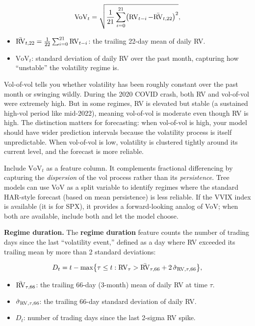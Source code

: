 \begin{equation}\label{eq:vol-of-vol}
\text{VoV}_t = \sqrt{\frac{1}{21}\sum_{i=0}^{21} \bigl(\operatorname{RV}_{t-i} - \bar{\operatorname{RV}}_{t,22}\bigr)^2},
\end{equation}
\begin{itemize}[nosep]
  \item $\bar{\operatorname{RV}}_{t,22} = \frac{1}{22}\sum_{i=0}^{21} \operatorname{RV}_{t-i}$: the trailing 22-day mean of daily RV.
  \item $\text{VoV}_t$: standard deviation of daily RV over the past month, capturing how ``unstable'' the volatility regime is.
\end{itemize}

\begin{intuition}
Vol-of-vol tells you whether volatility has been roughly constant over the past month or swinging wildly.
During the 2020 COVID crash, both RV and vol-of-vol were extremely high.
But in some regimes, RV is elevated but stable (a sustained high-vol period like mid-2022), meaning vol-of-vol is moderate even though RV is high.
The distinction matters for forecasting: when vol-of-vol is high, your model should have wider prediction intervals because the volatility process is itself unpredictable.
When vol-of-vol is low, volatility is clustered tightly around its current level, and the forecast is more reliable.
\end{intuition}

\begin{projectconnection}
Include $\text{VoV}_t$ as a feature column.
It complements fractional differencing by capturing the \emph{dispersion} of the vol process rather than its \emph{persistence}.
Tree models can use VoV as a split variable to identify regimes where the standard HAR-style forecast (based on mean persistence) is less reliable.
If the VVIX index is available (it is for SPX), it provides a forward-looking analog of VoV; when both are available, include both and let the model choose.
\end{projectconnection}

\textbf{Regime duration.}
The \textbf{regime duration} feature counts the number of trading days since the last ``volatility event,'' defined as a day where RV exceeded its trailing mean by more than 2 standard deviations:

\begin{equation}\label{eq:regime-duration}
D_t = t - \max\bigl\{\tau \leq t : \operatorname{RV}_\tau > \bar{\operatorname{RV}}_{\tau,66} + 2\,\hat{\sigma}_{\operatorname{RV},\tau,66}\bigr\},
\end{equation}
\begin{itemize}[nosep]
  \item $\bar{\operatorname{RV}}_{\tau,66}$: the trailing 66-day (3-month) mean of daily RV at time $\tau$.
  \item $\hat{\sigma}_{\operatorname{RV},\tau,66}$: the trailing 66-day standard deviation of daily RV.
  \item $D_t$: number of trading days since the last 2-sigma RV spike.
\end{itemize}

